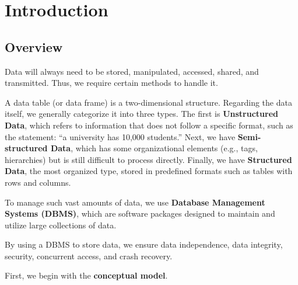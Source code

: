 \chapter{Introduction}

\section{Overview}
Data will always need to be stored, manipulated, accessed, shared, and transmitted. Thus, we require certain methods to handle it. 

A data table (or data frame) is a two-dimensional structure. Regarding the data itself, we generally categorize it into three types. The first is \textbf{Unstructured Data}, which refers to information that does not follow a specific format, such as the statement: ``a university has 10,000 students.'' Next, we have \textbf{Semi-structured Data}, which has some organizational elements (e.g., tags, hierarchies) but is still difficult to process directly. Finally, we have \textbf{Structured Data}, the most organized type, stored in predefined formats such as tables with rows and columns. 

To manage such vast amounts of data, we use \textbf{Database Management Systems (DBMS)}, which are software packages designed to maintain and utilize large collections of data. 

By using a DBMS to store data, we ensure data independence, data integrity, security, concurrent access, and crash recovery.

First, we begin with the \textbf{conceptual model}.